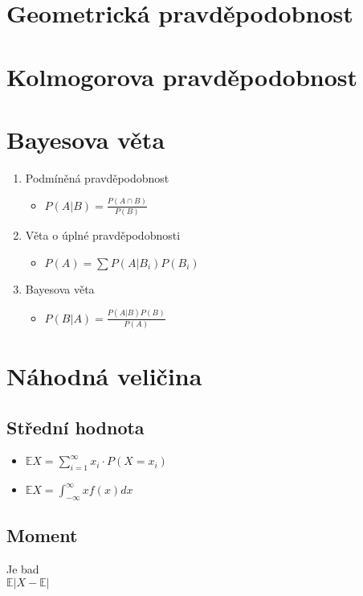 \section{Geometrická pravděpodobnost} 
\section{Kolmogorova pravděpodobnost}
\section{Bayesova věta}
    \begin{enumerate}
        \item Podmíněná pravděpodobnost
            \begin{itemize}
                \item $P(A|B)=\frac{P(A\cap B)}{P(B)}$
            \end{itemize}
        \item Věta o úplné pravděpodobnosti
            \begin{itemize}
                \item $P(A)=\sum P(A|B_i)P(B_i)$
            \end{itemize}
        \item Bayesova věta
            \begin{itemize}
                \item $P(B|A)=\frac{P(A|B)P(B)}{P(A)}$
            \end{itemize}
    \end{enumerate}

\section{Náhodná veličina}
    \subsection{Střední hodnota}
        \begin{itemize}
            \item $\mathbb{E}X = \sum_{i=1}^\infty x_i \cdot P(X=x_i)$
            \item $\mathbb{E}X = \int^\infty_{-\infty} xf(x)dx$
        \end{itemize}
    \subsection{Moment}
        Je bad\\
        $\mathbb{E}|X-\mathbb{E}|$
